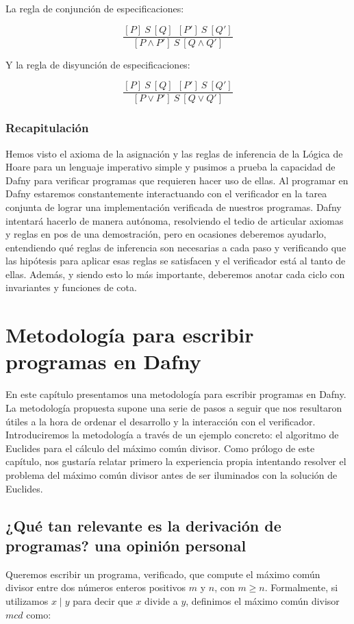 \documentclass[12pt, a4paper, openany, fleqn]{book}
\newcommand{\hoareTheorem}[3]{\ensuremath{[#1]\ #2\ [#3]}}
\newcommand{\inferenceRule}[2]{
    \begin{equation*}
        \frac{#1}{#2}
    \end{equation*}
}
\begin{document}
    La regla de conjunción de especificaciones:
    \inferenceRule{\hoareTheorem{P}{S}{Q}\ \ \hoareTheorem{P'}{S}{Q'}}{\hoareTheorem{P \land P'}{S}{Q \land Q'}}

    Y la regla de disyunción de especificaciones:
    \inferenceRule{\hoareTheorem{P}{S}{Q}\ \ \hoareTheorem{P'}{S}{Q'}}{\hoareTheorem{P \lor P'}{S}{Q \lor Q'}}

    \subsection{Recapitulación}
    Hemos visto el axioma de la asignación y las reglas de inferencia de la Lógica de Hoare para un lenguaje imperativo simple y pusimos a prueba la capacidad de Dafny para verificar programas que requieren hacer uso de ellas. Al programar en Dafny estaremos constantemente interactuando con el verificador en la tarea conjunta de lograr una implementación verificada de nuestros programas. Dafny intentará hacerlo de manera autónoma, resolviendo el tedio de articular axiomas y reglas en pos de una demostración, pero en ocasiones deberemos ayudarlo, entendiendo qué reglas de inferencia son necesarias a cada paso y verificando que las hipótesis para aplicar esas reglas se satisfacen y el verificador está al tanto de ellas. Además, y siendo esto lo más importante, deberemos anotar cada ciclo con invariantes y funciones de cota.

    \chapter{Metodología para escribir programas en Dafny}
    En este capítulo presentamos una metodología para escribir programas en Dafny. La metodología propuesta supone una serie de pasos a seguir que nos resultaron útiles a la hora de ordenar el desarrollo y la interacción con el verificador.
    Introduciremos la metodología a través de un ejemplo concreto: el algoritmo de Euclides para el cálculo del máximo común divisor. Como prólogo de este capítulo, nos gustaría relatar primero la experiencia propia intentando resolver el problema del máximo común divisor antes de ser iluminados con la solución de Euclides.

    \section{¿Qué tan relevante es la derivación de programas? una opinión personal}
    Queremos escribir un programa, verificado, que compute el máximo común divisor entre dos números enteros positivos $m$ y $n$, con $m \geqslant n$. Formalmente, si utilizamos $x \mid y$ para decir que $x$ divide a $y$, definimos el máximo común divisor $mcd$ como:
\end{document}
